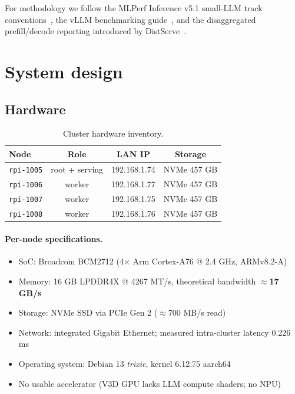 \documentclass[10pt,a4paper]{article}
\begin{document}
For methodology we follow the MLPerf Inference v5.1 small-LLM track conventions~\cite{mlperf2025}, the vLLM benchmarking guide~\cite{kwon2023vllm}, and the disaggregated prefill/decode reporting introduced by DistServe~\cite{zhong2024distserve}.

\section{System design}

\subsection{Hardware}

\begin{table}[H]
\centering
\caption{Cluster hardware inventory.}
\small
\begin{tabular}{lccc}
\toprule
\textbf{Node} & \textbf{Role} & \textbf{LAN IP} & \textbf{Storage} \\
\midrule
\texttt{rpi-1005} & root + serving & 192.168.1.74 & NVMe 457 GB \\
\texttt{rpi-1006} & worker        & 192.168.1.77 & NVMe 457 GB \\
\texttt{rpi-1007} & worker        & 192.168.1.75 & NVMe 457 GB \\
\texttt{rpi-1008} & worker        & 192.168.1.76 & NVMe 457 GB \\
\bottomrule
\end{tabular}
\end{table}

\paragraph{Per-node specifications.}
\begin{itemize}
  \item SoC: Broadcom BCM2712 (4$\times$ Arm Cortex-A76 @ 2.4 GHz, ARMv8.2-A)
  \item Memory: 16 GB LPDDR4X @ 4267 MT/s, theoretical bandwidth $\approx$\textbf{17 GB/s}
  \item Storage: NVMe SSD via PCIe Gen 2 ($\approx$700 MB/s read)
  \item Network: integrated Gigabit Ethernet; measured intra-cluster latency 0.226 ms
  \item Operating system: Debian 13 \emph{trixie}, kernel 6.12.75 aarch64
  \item No usable accelerator (V3D GPU lacks LLM compute shaders; no NPU)
\end{itemize}
\end{document}
